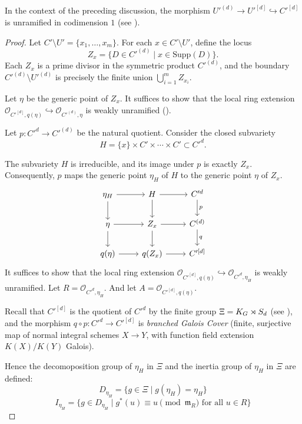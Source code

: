 \begin{lemma}\label{lemma:torsor_unramified_codim_one:reorg}
In the context of the preceding discussion, the morphism $U'^{(d)} \to U'^{[d]} \hookrightarrow C'^{[d]}$
is unramified in codimension $1$ (see ).
\end{lemma}
\begin{proof}

Let $C' \setminus U' = \{x_1, \ldots, x_m \}$. For each $x \in C' \setminus U'$, define the locus 
$$Z_x = \{D \in C'^{(d)} \mid x \in \mathrm{Supp}(D) \}.$$
Each $Z_x$ is a prime divisor in the symmetric product $C'^{(d)}$, and the boundary $C'^{(d)} \setminus U'^{(d)}$ is precisely the finite union $\bigcup_{i=1}^m Z_{x_i}$. 

Let $\eta$ be the generic point of $Z_x$. 
It suffices to show that the local ring extension $\mathcal{O}_{C'^{[d]}, q(\eta)} \hookrightarrow \mathcal{O}_{C'^{(d)}, \eta}$ is weakly unramified ().

Let $p: C'^d \to C'^{(d)}$ be the natural quotient. Consider the closed subvariety
$$H = \{x\} \times C' \times \cdots \times C' \subset C'^d.$$

The subvariety $H$ is irreducible, and its image under $p$ is exactly $Z_x$. 
Consequently, $p$ maps the generic point $\eta_H$ of $H$ to the generic point $\eta$ of $Z_x$.
\[
\begin{tikzcd}
\eta_H \arrow[d] \arrow[r] & H \arrow[r] \arrow[d] & C'^d \arrow[d, "p"] \\
\eta \arrow[r] \arrow[d] & Z_x \arrow[r] \arrow[d] & C^{(d)} \arrow[d, "q"] \\
q(\eta) \arrow[r] & q(Z_x) \arrow[r] & C'^{[d]}
\end{tikzcd}
\]
It suffices to show that the local ring extension $\mathcal{O}_{C'^{[d]}, q(\eta)} \hookrightarrow \mathcal{O}_{C'^d, \eta_H}$ is weakly unramified.
Let $R = \mathcal{O}_{C'^d, \eta_H}$. And let $A=\mathcal{O}_{C'^{[d]}, q(\eta)}$.

Recall that $C'^{[d]}$ is the quotient of $C'^d$ by the finite group $\Xi = K_{G} \rtimes S_d$ (see ),
and the morphism $q \circ p : C'^d \to C'^{[d]}$ is \textit{branched Galois Cover} (finite, surjective map of normal integral schemes $X \to Y$, with function field extension $K(X)/K(Y)$ Galois).

Hence the decomoposition group of $\eta_H$ in $\Xi$ and the inertia group of $\eta_H$ in $\Xi$ are defined:
$$D_{\eta_H} = \{ g \in \Xi \mid g(\eta_H) = \eta_H \}$$
$$I_{\eta_H} = \{ g \in D_{\eta_H} \mid g^*(u) \equiv u \pmod{\mathfrak{m}_{R}} \text{ for all } u \in R \}$$


\end{proof}
